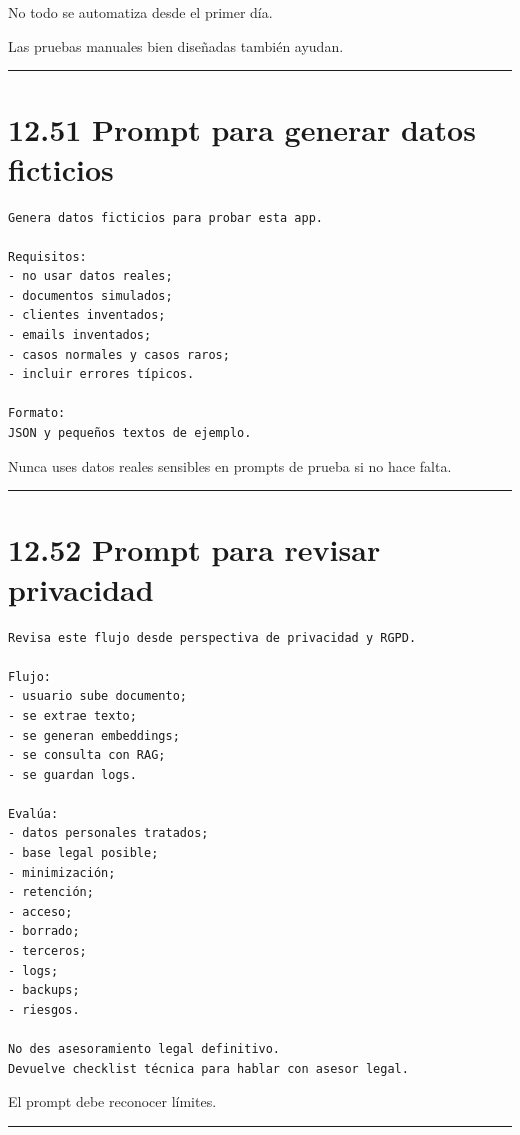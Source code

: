 No todo se automatiza desde el primer día.

Las pruebas manuales bien diseñadas también ayudan.

\begin{center}\rule{0.5\linewidth}{0.5pt}\end{center}

\section{12.51 Prompt para generar datos
ficticios}\label{prompt-para-generar-datos-ficticios}

\begin{lstlisting}
Genera datos ficticios para probar esta app.

Requisitos:
- no usar datos reales;
- documentos simulados;
- clientes inventados;
- emails inventados;
- casos normales y casos raros;
- incluir errores típicos.

Formato:
JSON y pequeños textos de ejemplo.
\end{lstlisting}

Nunca uses datos reales sensibles en prompts de prueba si no hace falta.

\begin{center}\rule{0.5\linewidth}{0.5pt}\end{center}

\section{12.52 Prompt para revisar
privacidad}\label{prompt-para-revisar-privacidad}

\begin{lstlisting}
Revisa este flujo desde perspectiva de privacidad y RGPD.

Flujo:
- usuario sube documento;
- se extrae texto;
- se generan embeddings;
- se consulta con RAG;
- se guardan logs.

Evalúa:
- datos personales tratados;
- base legal posible;
- minimización;
- retención;
- acceso;
- borrado;
- terceros;
- logs;
- backups;
- riesgos.

No des asesoramiento legal definitivo.
Devuelve checklist técnica para hablar con asesor legal.
\end{lstlisting}

El prompt debe reconocer límites.

\begin{center}\rule{0.5\linewidth}{0.5pt}\end{center}

